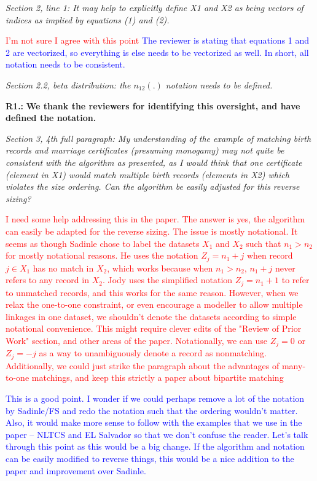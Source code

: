 \documentclass[letterpaper, parskip]{scrartcl}
\newcommand{\pointRaised}[1]{%
	\begin{tcolorbox}
		\itshape #1
	\end{tcolorbox}
}
\newcounter{responsectr}[section]     %
\newcommand{\reply}[2]{%
	\refstepcounter{responsectr}%
	\textbf{#1.\theresponsectr:} #2
}
\begin{document}
		\pointRaised{%
Section 2, line 1: It may help to explicitly define X1 and X2 as being vectors of indices as implied
by equations (1) and (2).
}
\textcolor{red}{I'm not sure I agree with this point}
\textcolor{blue}{The reviewer is stating that equations 1 and 2 are vectorized, so everything is else needs to be vectorized as well. In short, all notation needs to be consistent.}

		\pointRaised{%
Section 2.2, beta distribution: the $n_{12}(.)$ notation needs to be defined.
}
		\reply{R1}{%
			\textbf{We thank the reviewers for identifying this oversight, and have defined the notation.}
		}

		\pointRaised{%
Section 3, 4th full paragraph: My understanding of the example of matching birth records and
marriage certificates (presuming monogamy) may not quite be consistent with the algorithm as
presented, as I would think that one certificate (element in X1) would match multiple birth
records (elements in X2) which violates the size ordering. Can the algorithm be easily adjusted
for this reverse sizing?
}

\textcolor{red}{I need some help addressing this in the paper. The answer is yes, the algorithm can easily be adapted for the reverse sizing. The issue is mostly notational. It seems as though Sadinle chose to label the datasets $X_1$ and $X_2$ such that $n_1 > n_2$ for mostly notational reasons. He uses the notation $Z_j = n_1 + j$ when record $j \in X_1$ has no match in $X_2$, which works because when $n_1 > n_2$, $n_1 + j$ never refers to any record in $X_2$. Jody uses the simplified notation $Z_j = n_1 + 1$ to refer to unmatched records, and this works for the same reason. 
However, when we relax the one-to-one constraint, or even encourage a modeller to allow multiple linkages in one dataset, we shouldn't denote the datasets according to simple notational convenience. This might require clever edits of the "Review of Prior Work" section, and other areas of the paper. 
Notationally, we can use  $Z_j = 0$ or $Z_j = -j$ as a way to unambiguously denote a record as nonmatching.
Additionally, we could just strike the paragraph about the advantages of many-to-one matchings, and keep this strictly a paper about bipartite matching}

\textcolor{blue}{This is a good point. I wonder if we could perhaps remove a lot of the notation by Sadinle/FS and redo the notation such that the ordering wouldn't matter. Also, it would make more sense to follow with the examples that we use in the paper -- NLTCS and EL Salvador so that we don't confuse the reader. Let's talk through this point as this would be a big change. If the algorithm and notation can be easily modified to reverse things, this would be a nice addition to the paper and improvement over Sadinle.} 
\end{document}

